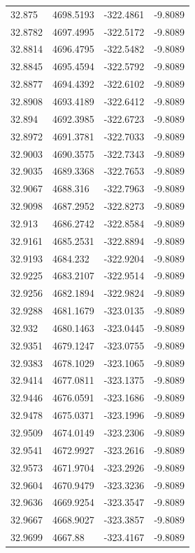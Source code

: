 \begin{table}[H]
\begin{tabular}{llll}
32.875 & 4698.5193 & -322.4861 & -9.8089 \\
32.8782 & 4697.4995 & -322.5172 & -9.8089 \\
32.8814 & 4696.4795 & -322.5482 & -9.8089 \\
32.8845 & 4695.4594 & -322.5792 & -9.8089 \\
32.8877 & 4694.4392 & -322.6102 & -9.8089 \\
32.8908 & 4693.4189 & -322.6412 & -9.8089 \\
32.894 & 4692.3985 & -322.6723 & -9.8089 \\
32.8972 & 4691.3781 & -322.7033 & -9.8089 \\
32.9003 & 4690.3575 & -322.7343 & -9.8089 \\
32.9035 & 4689.3368 & -322.7653 & -9.8089 \\
32.9067 & 4688.316 & -322.7963 & -9.8089 \\
32.9098 & 4687.2952 & -322.8273 & -9.8089 \\
32.913 & 4686.2742 & -322.8584 & -9.8089 \\
32.9161 & 4685.2531 & -322.8894 & -9.8089 \\
32.9193 & 4684.232 & -322.9204 & -9.8089 \\
32.9225 & 4683.2107 & -322.9514 & -9.8089 \\
32.9256 & 4682.1894 & -322.9824 & -9.8089 \\
32.9288 & 4681.1679 & -323.0135 & -9.8089 \\
32.932 & 4680.1463 & -323.0445 & -9.8089 \\
32.9351 & 4679.1247 & -323.0755 & -9.8089 \\
32.9383 & 4678.1029 & -323.1065 & -9.8089 \\
32.9414 & 4677.0811 & -323.1375 & -9.8089 \\
32.9446 & 4676.0591 & -323.1686 & -9.8089 \\
32.9478 & 4675.0371 & -323.1996 & -9.8089 \\
32.9509 & 4674.0149 & -323.2306 & -9.8089 \\
32.9541 & 4672.9927 & -323.2616 & -9.8089 \\
32.9573 & 4671.9704 & -323.2926 & -9.8089 \\
32.9604 & 4670.9479 & -323.3236 & -9.8089 \\
32.9636 & 4669.9254 & -323.3547 & -9.8089 \\
32.9667 & 4668.9027 & -323.3857 & -9.8089 \\
32.9699 & 4667.88 & -323.4167 & -9.8089 \\

\end{tabular}
\end{table}
